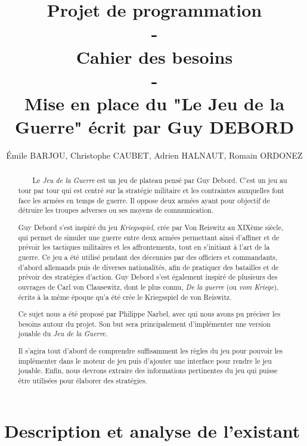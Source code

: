 \documentclass[a4paper]{report}
\title{Projet de programmation \\ - \\ Cahier des besoins \\ - \\ Mise en place du "Le Jeu de la Guerre" écrit par Guy DEBORD}
\author{Émile BARJOU, Christophe CAUBET, Adrien HALNAUT, Romain ORDONEZ}
\begin{document}
\renewcommand{\labelitemi}{$\bullet$}
\maketitle

\begin{abstract}
\ \ \ \ Le \textit{Jeu de la Guerre}\cite{jdg} est un jeu de plateau pensé par Guy Debord.
C'est un jeu au tour par tour qui est centré sur la stratégie militaire et les contraintes auxquelles font face les armées en temps de guerre.
Il oppose deux armées ayant pour objectif de détruire les troupes adverses ou ses moyens de communication. 

Guy Debord s'est inspiré du jeu \textit{Kriegsspiel}, crée par Von Reiswitz au XIXème siècle, qui permet de simuler une guerre entre deux armées permettant ainsi d'affiner et de prévoir les tactiques militaires et les affrontements, tout en s'initiant à l'art de la guerre. Ce jeu a été utilisé pendant des décennies par des officiers et commandants, d'abord allemands puis de diverses nationalités, afin de pratiquer des batailles et de prévoir des stratégies d'action. Guy Debord s'est également inspiré de plusieurs des ouvrages de Carl von Clausewitz, dont le plus connu, \textit{De la guerre} (ou \textit{vom Kriege})\cite{vomkriege}, écrits à la même époque qu'a été crée le Kriegsspiel de von Reiswitz\cite{kriegsspiel}.
\newline


Ce sujet nous a été proposé par Philippe Narbel, avec qui nous avons pu préciser les besoins autour du projet. Son but sera principalement d'implémenter une version jouable du \textit{Jeu de la Guerre}.

Il s'agira tout d'abord de comprendre suffisamment les règles du jeu pour pouvoir les implémenter dans le moteur de jeu puis d'ajouter une interface pour rendre le jeu jouable. Enfin, nous devrons extraire des informations pertinentes du jeu qui puisse être utilisées pour élaborer des stratégies.

\end{abstract}

\chapter{Description et analyse de l'existant}
\end{document}

